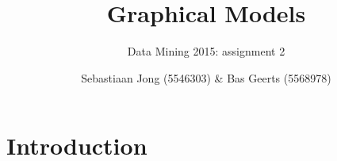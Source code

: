 \documentclass[a4paper,12pt]{scrartcl}
\begin{document}
\title{Graphical Models}
\subtitle{Data Mining 2015: assignment 2}
\author{Sebastiaan Jong (5546303) \& Bas Geerts (5568978)}
\date{}
\maketitle
\section{Introduction}
\end{document}
